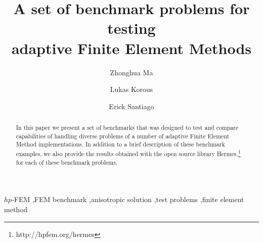 \begin{frontmatter}

\title{A set of benchmark problems for testing\\ adaptive Finite Element Methods}

\author[label1]{Zhonghua Ma}
\author[label2]{Lukas Korous}
\author[label3]{Erick Santiago}
\address[label1]{China University of Petroleum, Beijing, China}
\address[label2]{Charles University, Prague, Czech Republic}
\address[label3]{University of Nevada, Reno, USA}

\begin{abstract}
In this paper we present a set of benchmarks that was designed to
test and compare capabilities of handling diverse problems of a number
of adaptive Finite Element Method implementations. In addition to a brief description of these benchmark examples, we also provide the results obtained with the open source library {\sc Hermes}.\footnote{http://hpfem.org/hermes} for each of these benchmark problems.
\end{abstract}

\begin{keyword}
$hp$-FEM \sep FEM benchmark \sep anisotropic solution \sep test problems \sep finite element method
\end{keyword}

\end{frontmatter}
